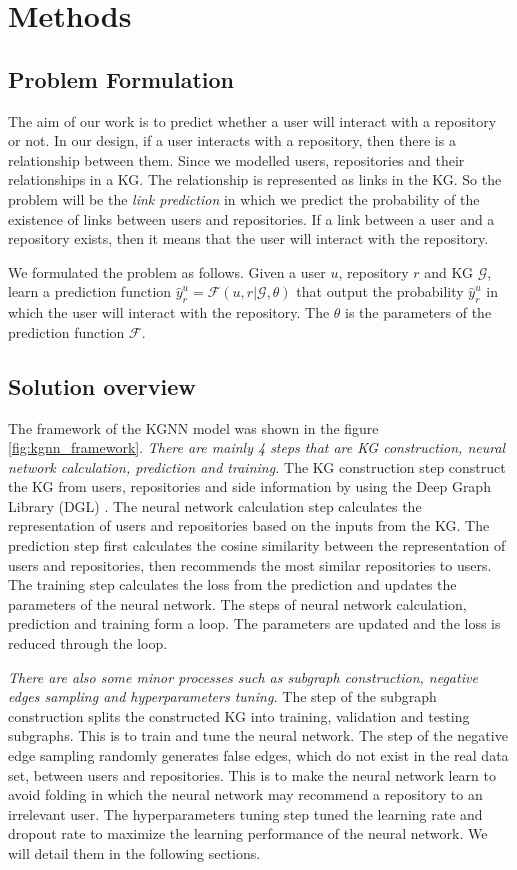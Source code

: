 \documentclass[11pt,twoside]{report}
\begin{document}
\chapter{Methods}
\section{Problem Formulation}
The aim of our work is to predict whether a user will interact with a repository or not. In our design, if a user interacts with a repository, then there is a relationship between them. Since we modelled users, repositories and their relationships in a KG. The relationship is represented as links in the KG. So the problem will be the \textit{link prediction} in which we predict the probability of the existence of links between users and repositories. If a link between a user and a repository exists, then it means that the user will interact with the repository.

We formulated the problem as follows. Given a user $u$, repository $r$ and KG $\mathcal{G}$, learn a prediction function $\hat{y}_r^u=\mathcal{F}(u,r|\mathcal{G},\theta)$ that output the probability $\hat{y}_r^u$ in which the user will interact with the repository. The $\theta$ is the parameters of the prediction function $\mathcal{F}$.

\section{Solution overview}
The framework of the KGNN model was shown in the figure \ref{fig:kgnn_framework}. \textit{There are mainly 4 steps that are KG construction, neural network calculation, prediction and training.} The KG construction step construct the KG from users, repositories and side information by using the Deep Graph Library (DGL) \cite{wang2019dgl}. The neural network calculation step calculates the representation of users and repositories based on the inputs from the KG. The prediction step first calculates the cosine similarity between the representation of users and repositories, then recommends the most similar repositories to users. The training step calculates the loss from the prediction and updates the parameters of the neural network. The steps of neural network calculation, prediction and training form a loop. The parameters are updated and the loss is reduced through the loop.

\textit{There are also some minor processes such as subgraph construction, negative edges sampling and hyperparameters tuning.} The step of the subgraph construction splits the constructed KG into training, validation and testing subgraphs. This is to train and tune the neural network. The step of the negative edge sampling randomly generates false edges, which do not exist in the real data set, between users and repositories. This is to make the neural network learn to avoid folding \cite{xin_folding_2017} in which the neural network may recommend a repository to an irrelevant user. The hyperparameters tuning step tuned the learning rate and dropout rate to maximize the learning performance of the neural network. We will detail them in the following sections.
\end{document}
